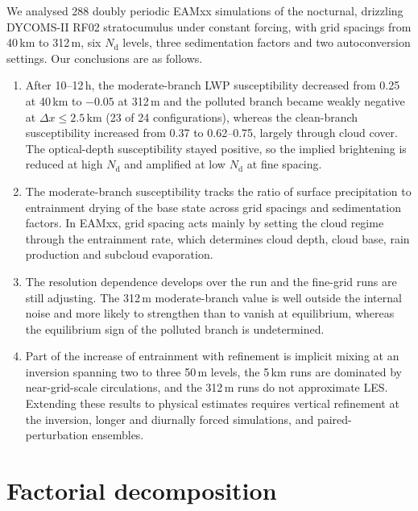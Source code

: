 \documentclass[acp, manuscript]{copernicus}
\newcommand{\Nd}{N_\mathrm{d}}
\newcommand{\dx}{\Delta x}
\begin{document}
We analysed 288 doubly periodic EAMxx simulations of the nocturnal, drizzling DYCOMS-II RF02 stratocumulus under constant forcing, with grid spacings from 40\,km to 312\,m, six $\Nd$ levels, three sedimentation factors and two autoconversion settings. Our conclusions are as follows.
\begin{enumerate}
\item After 10--12\,h, the moderate-branch LWP susceptibility decreased from 0.25 at 40\,km to $-0.05$ at 312\,m and the polluted branch became weakly negative at $\dx\leq2.5$\,km (23 of 24 configurations), whereas the clean-branch susceptibility increased from 0.37 to 0.62--0.75, largely through cloud cover. The optical-depth susceptibility stayed positive, so the implied brightening is reduced at high $\Nd$ and amplified at low $\Nd$ at fine spacing.
\item The moderate-branch susceptibility tracks the ratio of surface precipitation to entrainment drying of the base state across grid spacings and sedimentation factors. In EAMxx, grid spacing acts mainly by setting the cloud regime through the entrainment rate, which determines cloud depth, cloud base, rain production and subcloud evaporation.
\item The resolution dependence develops over the run and the fine-grid runs are still adjusting. The 312\,m moderate-branch value is well outside the internal noise and more likely to strengthen than to vanish at equilibrium, whereas the equilibrium sign of the polluted branch is undetermined.
\item Part of the increase of entrainment with refinement is implicit mixing at an inversion spanning two to three 50\,m levels, the 5\,km runs are dominated by near-grid-scale circulations, and the 312\,m runs do not approximate LES. Extending these results to physical estimates requires vertical refinement at the inversion, longer and diurnally forced simulations, and paired-perturbation ensembles.
\end{enumerate}

\appendix

\section{Factorial decomposition}\label{app:decomp}
\end{document}
